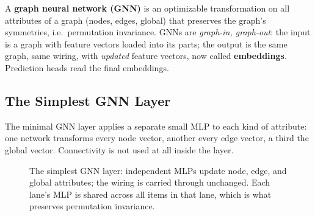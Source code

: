 A \textbf{graph neural network (GNN)} is an optimizable transformation on all attributes of a graph (nodes, edges, global) that preserves the graph's symmetries, i.e.\ permutation invariance. GNNs are \emph{graph-in, graph-out}: the input is a graph with feature vectors loaded into its parts; the output is the same graph, same wiring, with \emph{updated} feature vectors, now called \textbf{embeddings}. Prediction heads read the final embeddings.

\subsection{The Simplest GNN Layer}\label{sec:gnn:simplest}

The minimal GNN layer applies a separate small MLP to each kind of attribute: one network transforms every node vector, another every edge vector, a third the global vector. Connectivity is not used at all inside the layer.

\begin{figure}[ht]
\centering
{}
\caption{The simplest GNN layer: independent MLPs update node, edge, and global attributes; the wiring is carried through unchanged. Each lane's MLP is shared across all items in that lane, which is what preserves permutation invariance.}
\label{fig:gnn:simplest-layer}
\end{figure}

